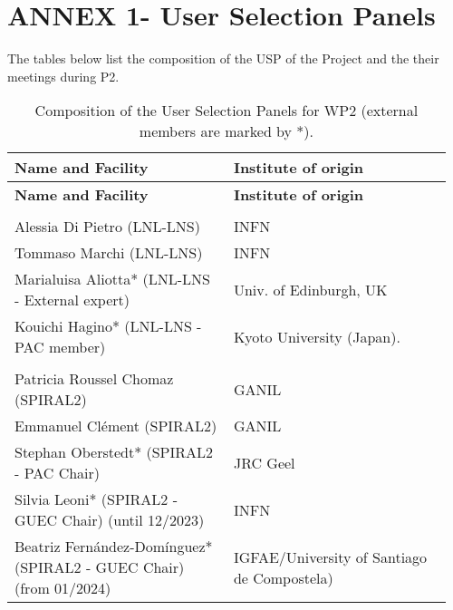 %

\section{ANNEX 1- User Selection Panels} 
\label{sec:usp-composition}

The tables below list the composition of the USP of the Project and the their meetings during P2. 

\begin{longtable}{|L{0.48\linewidth}|C{0.48\linewidth}|}
\caption{Composition of the User Selection Panels for WP2 (external members are marked by *).}
\label{tab:usp-wp2}
    \\ \hline
    {\bf Name and Facility} & {\bf Institute of origin} \\ \hline
    \endfirsthead
    \hline
    {\bf Name and Facility} & {\bf Institute of origin} \\ \hline
    \endhead
    \hline
    \endfoot

      \\ \hline
    Alessia Di Pietro (LNL-LNS)	& INFN \\ \hline
    Tommaso Marchi (LNL-LNS)	 & INFN \\ \hline
    Marialuisa Aliotta* (LNL-LNS - External expert) &	Univ. of Edinburgh, UK \\ \hline
    Kouichi Hagino*  (LNL-LNS - PAC member)	& Kyoto University (Japan). \\ \hline
    
      \\ \hline
    Patricia Roussel Chomaz  (SPIRAL2)	& GANIL \\ \hline
    Emmanuel Clément (SPIRAL2)	& GANIL \\ \hline
    Stephan Oberstedt* (SPIRAL2 - PAC Chair) &	JRC Geel \\ \hline
    Silvia Leoni* (SPIRAL2 - GUEC Chair) (until 12/2023)	& INFN \\ \hline
   Beatriz Fernández-Domínguez* (SPIRAL2 - GUEC Chair) (from 01/2024)	& 
IGFAE/University of Santiago de Compostela)  \\ \hline
        

\end{longtable}
